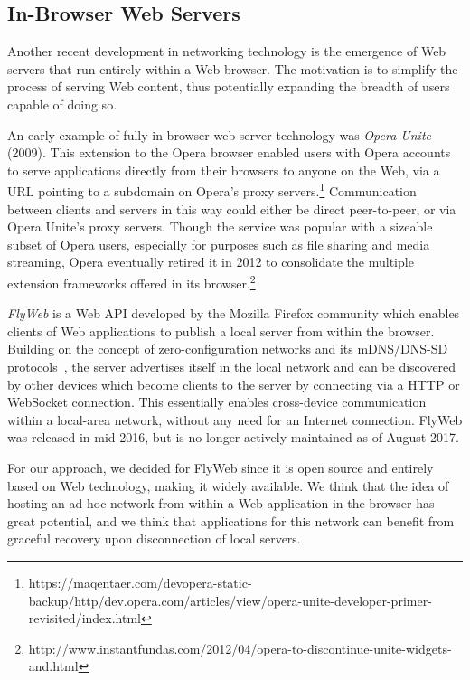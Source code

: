 \subsection{In-Browser Web Servers}
\label{sub:background_in_browser_web_servers}

Another recent development in networking technology is the emergence of Web servers that run entirely within a Web browser. 
The motivation is to simplify the process of serving Web content, thus potentially expanding the breadth of users capable of doing so.

An early example of fully in-browser web server technology was \textit{Opera Unite} (2009).
This extension to the Opera browser enabled users with Opera accounts to serve applications directly from their browsers to anyone on the Web, via a URL pointing to a subdomain on Opera's proxy servers.\footnote{https://maqentaer.com/devopera-static-backup/http/dev.opera.com/articles/view/opera-unite-developer-primer-revisited/index.html}
Communication between clients and servers in this way could either be direct peer-to-peer, or via Opera Unite's proxy servers.
Though the service was popular with a sizeable subset of Opera users, especially for purposes such as file sharing and media streaming, Opera eventually retired it in 2012 to consolidate the multiple extension frameworks offered in its browser.\footnote{http://www.instantfundas.com/2012/04/opera-to-discontinue-unite-widgets-and.html}

\textit{FlyWeb} is a Web API developed by the Mozilla Firefox community which enables clients of Web applications to publish a local server from within the browser.
Building on the concept of zero-configuration networks and its mDNS/DNS-SD protocols~\cite{rfc6762, rfc6763}, the server advertises itself in the local network and can be discovered by other devices which become clients to the server by connecting via a HTTP or WebSocket connection.
This essentially enables cross-device communication within a local-area network, without any need for an Internet connection.
FlyWeb was released in mid-2016, but is no longer actively maintained as of August 2017.

For our approach, we decided for FlyWeb since it is open source and entirely based on Web technology, making it widely available.
We think that the idea of hosting an ad-hoc network from within a Web application in the browser has great potential, and we think that applications for this network can benefit from graceful recovery upon disconnection of local servers.
